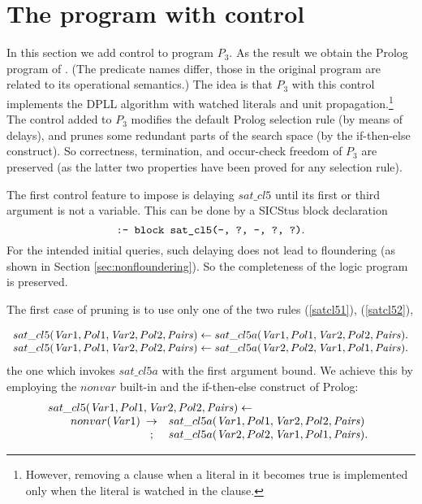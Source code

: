 \documentclass{tlp}
\begin{document}
\section{The program with control}
\label{sec:prologprogram}
 In this section we add control to program $P_3$.
As the result we obtain the Prolog program of  .  
(The
 predicate names differ, those in the original program are related
 to its operational semantics.)
The idea is that $P_3$ with this control implements
the DPLL algorithm with watched literals and unit propagation.\footnote{However, removing a clause when a literal in it becomes true is implemented
only when the literal is watched in the clause.
}
The control added to $P_3$ modifies
 the default Prolog selection rule (by means of delays),
and prunes some redundant parts of the search space (by the if-then-else
construct).  So correctness, termination, and occur-check freedom of $P_3$
are preserved 
(as the latter two properties have been proved for any selection rule).  



The first control feature to impose is delaying $sat\_cl5$ until 
its first or third argument is not a variable.  This can be done by a
SICStus block declaration
    \begin{equation}
    \label{block}
      \mbox{\tt:- block sat\_cl5(-, ?, -, ?, ?)}.
    \end{equation}
For the intended initial queries, such delaying does not lead to floundering
(as shown in Section \ref{sec:nonfloundering}). So the completeness of the logic program
is preserved.

The first case of pruning is to use
only one of the two rules (\ref{satcl51}), (\ref{satcl52}),
\par
{\footnotesize
 \[
 \begin{array}{l}
 sat\_cl5({\it Var}1, Pol1, {\it Var}2, Pol2, {\it Pairs}) \gets
 sat\_cl5a({\it Var}1, Pol1, {\it Var}2, Pol2, {\it Pairs}).
 \\
 sat\_cl5({\it Var}1, Pol1, {\it Var}2, Pol2, {\it Pairs}) \gets
 sat\_cl5a({\it Var}2, Pol2, {\it Var}1, Pol1, {\it Pairs}).
 \end{array}
 \]
}the one which invokes $sat\_cl5a$ with the first argument bound.
We achieve this by employing the $non var$ built-in and the if-then-else
construct of Prolog:
\begin{equation}
\label{satcl5P}
 \begin{array}{l}
   sat\_cl5({\it Var}1, Pol1, {\it Var}2, Pol2, {\it Pairs}) \gets  
   \\\qquad
   non var({\it Var}1) 
   \begin{array}[t]{cl}
\to & sat\_cl5a({\it Var}1, Pol1, {\it Var}2, Pol2, {\it Pairs})
       \\
; &    sat\_cl5a({\it Var}2, Pol2, {\it Var}1, Pol1,  {\it Pairs}).
   \end{array}
 \end{array}
\end{equation}
\end{document}
